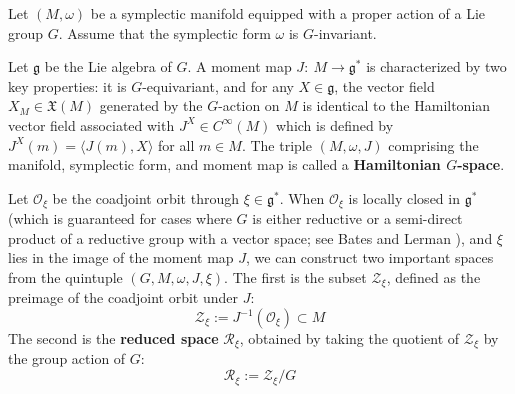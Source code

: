\documentclass[12pt]{amsart}
\theoremstyle{definition}
\numberwithin{equation}{section}
\newcommand{\gstar}{\mathfrak{g}^*}
\newcommand{\Oxi}{\mathcal{O}_{\xi}}
\newcommand{\galgebra}{\mathfrak{g}}
\newcommand{\Cinf}{C^\infty}
\newcommand{\Zxi}{\mathcal{Z}_{\xi}}
\newcommand{\Reducedxi}{\mathcal{R}_\xi}
\begin{document}
	
 	
Let $(M,\omega)$ be a symplectic manifold equipped with a proper action of a Lie group $G$. Assume that the symplectic form $\omega$ is $G$-invariant.
	
	
	Let $\galgebra$ be the Lie algebra of $G$. A moment map $J:~M\to \gstar$ is characterized by two key properties: it is $G$-equivariant, and for any $X\in \galgebra$, the vector field $X_{M} \in \mathfrak{X}(M)$ generated by the $G$-action on $M$ is identical to the Hamiltonian vector field associated with $J^X\in \Cinf(M)$ which is defined by $J^X(m)=\langle J(m),X \rangle$ for all $m \in M$. The triple $(M,\omega,J)$ comprising the manifold, symplectic form, and moment map is called a \textbf{Hamiltonian $G$-space}.
	
	
	Let $\Oxi$ be the coadjoint orbit through $\xi\in \gstar$. When $\Oxi$ is locally closed in $\gstar$ (which is guaranteed for cases where $G$ is either reductive or a semi-direct product of a reductive group with a vector space; see Bates and Lerman \cite{BatesLerman1997}), and $\xi$ lies in the image of the moment map $J$, we can construct two important spaces from the quintuple $(G,M,\omega,J,\xi)$. The first is the subset $\Zxi$, defined as the preimage of the coadjoint orbit under $J$:
	\begin{equation}
		\label{Eqt:Zxi}
		\Zxi:=J^{-1}(\Oxi)\subset M
	\end{equation}
	The second is the  \textbf{reduced space}  $\Reducedxi$, obtained by taking the quotient of $\Zxi$ by the group action of $G$:
	\begin{equation}
		\label{Eqt:Sxi}
		\Reducedxi:=\Zxi/G
	\end{equation}
	
\end{document}
